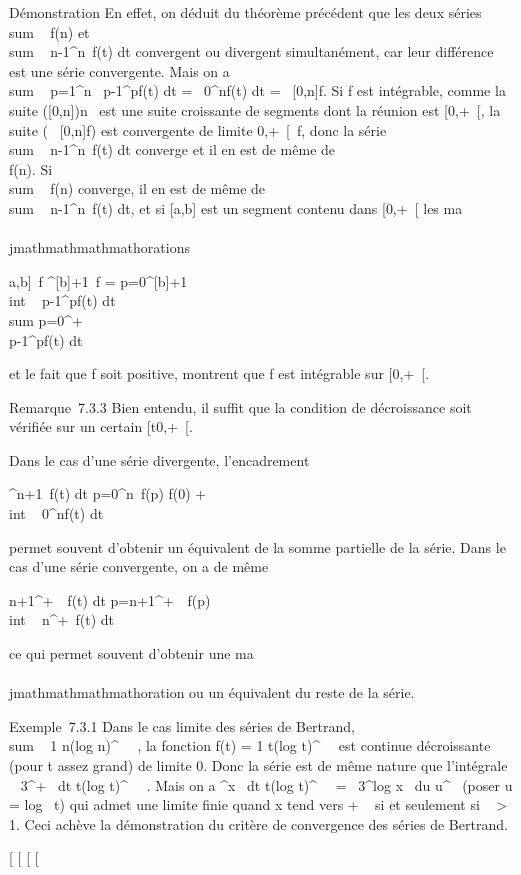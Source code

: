 Démonstration En effet, on déduit du théorème précédent que les deux
séries \\sum ~ f(n) et
\\sum ~
\int  n-1^n~f(t) dt convergent ou
divergent simultanément, car leur différence est une série convergente.
Mais on a \\sum ~
p=1^n\int ~
p-1^pf(t) dt =\int ~
0^nf(t) dt =\int ~
{[}0,n{]}f. Si f est intégrable, comme la suite
({[}0,n{]})n\in{}~ est une suite croissante de segments dont la
réunion est {[}0,+\infty~{[}, la suite (\int ~
{[}0,n{]}f) est convergente de limite
\int  {[}0,+\infty~{[}~f, donc la série
\\sum ~
\int  n-1^n~f(t) dt converge et
il en est de même de \\\sum
 f(n). Si \\sum ~
f(n) converge, il en est de même de
\\sum ~
\int  n-1^n~f(t) dt, et si
{[}a,b{]} est un segment contenu dans {[}0,+\infty~{[} les ma\\\\jmathmathmathmathorations

\int  {[}a,b{]}~f
\leq{}^{[}b{]}+1~f =
\sum p=0^{[}b{]}+1~
\\int  ~
p-1^pf(t) dt \leq\\sum
p=0^+\infty~\\\int
  p-1^pf(t) dt

et le fait que f soit positive, montrent que f est intégrable sur
{[}0,+\infty~{[}.

Remarque~7.3.3 Bien entendu, il suffit que la condition de décroissance
soit vérifiée sur un certain {[}t0,+\infty~{[}.

Dans le cas d'une série divergente, l'encadrement

^n+1~f(t) dt
\leq\sum p=0^n~f(p) \leq f(0) +
\\int  ~
0^nf(t) dt

permet souvent d'obtenir un équivalent de la somme partielle de la
série. Dans le cas d'une série convergente, on a de même

\int  n+1^+\infty~~f(t) dt
\leq\sum p=n+1^+\infty~~f(p)
\leq\\int  ~
n^+\infty~f(t) dt

ce qui permet souvent d'obtenir une ma\\\\jmathmathmathmathoration ou un équivalent du reste
de la série.

Exemple~7.3.1 Dans le cas limite des séries de Bertrand,
\\sum ~  1
\over n(log n)^\beta~~ ,
la fonction f(t) = 1 \over
t(log t)^\beta~~ est continue
décroissante (pour t assez grand) de limite 0. Donc la série est de même
nature que l'intégrale \int ~
3^+\infty~ dt \over
t(log t)^\beta~~ . Mais on a
^x~ dt
\over t(log t)^\beta~~
=\int  \log~
3^log x~ du \over
u^\beta~ (poser u = log~ t) qui admet
une limite finie quand x tend vers + \infty~ si et seulement si \beta~
\textgreater{} 1. Ceci achève la démonstration du critère de convergence
des séries de Bertrand.

{[}
{[}
{[}
{[}
